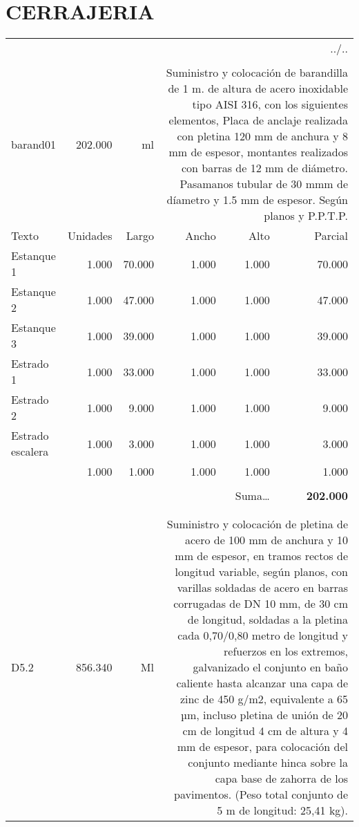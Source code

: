 \documentclass{book}%
\begin{document}
\section{CERRAJERIA}%
\label{sec:CERRAJERIA}%
\begin{longtable}{lrrrrr}%
\multicolumn{6}{r}{../..}\\%
\endfoot%
\endlastfoot%
&&&&&\\%
barand01&202.000& ml&\multicolumn{3}{p{6cm}}{\scriptsize Suministro y colocación de barandilla de 1 m. de altura de acero inoxidable tipo AISI 316, con los siguientes elementos, Placa de anclaje realizada con pletina 120 mm de anchura  y 8 mm de espesor, montantes realizados con barras de 12 mm de diámetro. Pasamanos tubular de 30 mmm de díametro y 1.5 mm de espesor. Según planos y P.P.T.P.\normalsize}\\%
Texto&Unidades&Largo&Ancho&Alto&Parcial\\%
\hline%
\multicolumn{1}{p{3.5cm}}{Estanque 1}&1.000&70.000&1.000&1.000&70.000\\%
\multicolumn{1}{p{3.5cm}}{Estanque 2}&1.000&47.000&1.000&1.000&47.000\\%
\multicolumn{1}{p{3.5cm}}{Estanque 3}&1.000&39.000&1.000&1.000&39.000\\%
\multicolumn{1}{p{3.5cm}}{Estrado 1}&1.000&33.000&1.000&1.000&33.000\\%
\multicolumn{1}{p{3.5cm}}{Estrado 2}&1.000&9.000&1.000&1.000&9.000\\%
\multicolumn{1}{p{3.5cm}}{Estrado escalera}&1.000&3.000&1.000&1.000&3.000\\%
\multicolumn{1}{p{3.5cm}}{}&1.000&1.000&1.000&1.000&1.000\\%
&&&&&\\%
\multicolumn{5}{r}{Suma\ldots}&\textbf{202.000}\\%
\hline%
&&&&&\\%
&&&&&\\%
D5.2&856.340& Ml&\multicolumn{3}{p{6cm}}{\scriptsize Suministro y colocación de pletina de acero de 100 mm de anchura y 10 mm de espesor, en tramos rectos de longitud variable, según planos, con varillas soldadas de acero en barras corrugadas de DN 10 mm, de 30 cm de longitud, soldadas a la pletina cada 0,70/0,80 metro de longitud y refuerzos en los extremos, galvanizado el conjunto en baño caliente hasta alcanzar una capa de zinc de 450 g/m2, equivalente a 65 µm, incluso pletina de unión de 20 cm de longitud 4 cm de altura y 4 mm de espesor, para colocación del conjunto mediante hinca sobre la capa base de zahorra de los pavimentos. (Peso total conjunto de 5 m de longitud: 25,41 kg).\normalsize}\\%

\end{longtable}
\end{document}

